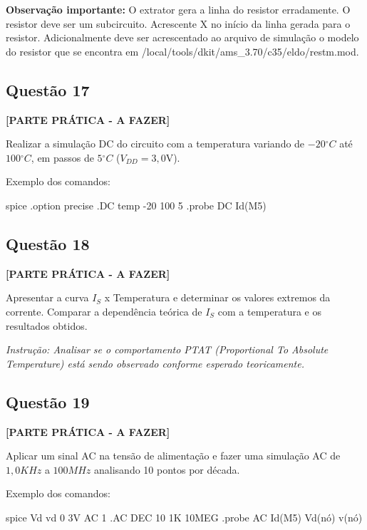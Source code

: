 \documentclass[12pt,a4paper]{article}
\newcommand{\degree}{\ensuremath{{}^\circ}}
\begin{document}
\textbf{Observação importante:} O extrator gera a linha do resistor erradamente. O resistor deve ser um subcircuito. Acrescente X no início da linha gerada para o resistor. Adicionalmente deve ser acrescentado ao arquivo de simulação o modelo do resistor que se encontra em /local/tools/dkit/ams\_3.70/c35/eldo/restm.mod.

\subsection*{Questão 17}

\textbf{[PARTE PRÁTICA - A FAZER]}

Realizar a simulação DC do circuito com a temperatura variando de $-20\degree C$ até $100\degree C$, em passos de $5\degree C$ ($V_{DD} = 3,0\text{V}$).

Exemplo dos comandos:

\begin{codeblockm}{spice}
.option precise
.DC temp -20 100 5
.probe DC Id(M5)
\end{codeblockm}

\subsection*{Questão 18}

\textbf{[PARTE PRÁTICA - A FAZER]}

Apresentar a curva $I_S$ x Temperatura e determinar os valores extremos da corrente. Comparar a dependência teórica de $I_S$ com a temperatura e os resultados obtidos.

\textit{Instrução: Analisar se o comportamento PTAT (Proportional To Absolute Temperature) está sendo observado conforme esperado teoricamente.}

\subsection*{Questão 19}

\textbf{[PARTE PRÁTICA - A FAZER]}

Aplicar um sinal AC na tensão de alimentação e fazer uma simulação AC de $1,0 KHz$ a $100 MHz$ analisando 10 pontos por década.

Exemplo dos comandos:

\begin{codeblockm}{spice}
Vd vd 0 3V AC 1
.AC DEC 10 1K 10MEG
.probe AC Id(M5) Vd(nó) v(nó)
\end{codeblockm}
\end{document}
